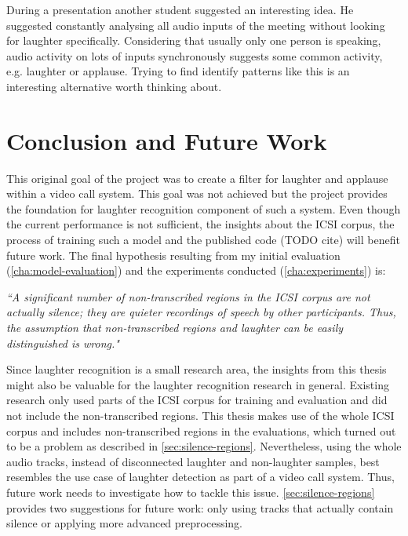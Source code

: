 \documentclass[bsc,frontabs,parskip,deptreport]{infthesis}
\begin{document}
During a presentation another student suggested an interesting idea. He suggested constantly analysing all audio inputs of the meeting without looking for laughter specifically. Considering that usually only one person is speaking, audio activity on lots of inputs synchronously suggests some common activity, e.g. laughter or applause. Trying to find identify patterns like this is an interesting alternative worth thinking about. 

\chapter{Conclusion and Future Work}
This original goal of the project was to create a filter for laughter and applause within a video call system. This goal was not achieved but the project provides the foundation for laughter recognition component of such a system.
Even though the current performance is not sufficient, the insights about the ICSI corpus, the process of training such a model and the published code (TODO cite) will benefit future work.
The final hypothesis resulting from my initial evaluation (\autoref{cha:model-evaluation}) and the experiments conducted (\autoref{cha:experiments}) is:

\textit{``A significant number of non-transcribed regions in the ICSI corpus are not actually silence; they are quieter recordings of speech by other participants. Thus, the assumption that non-transcribed regions and laughter can be easily distinguished is wrong."}

Since laughter recognition is a small research area, the insights from this thesis might also be valuable for the laughter recognition research in general. 
Existing research \citep{kennedy2004laughter,knox2006automatic, truong2005automatic} only used parts of the ICSI corpus for training and evaluation and did not include the non-transcribed regions. 
This thesis makes use of the whole ICSI corpus and includes non-transcribed regions in the evaluations, which turned out to be a problem as described in \autoref{sec:silence-regions}. Nevertheless, using the whole audio tracks, instead of disconnected laughter and non-laughter samples, best resembles the use case of laughter detection as part of a video call system. 
Thus, future work needs to investigate how to tackle this issue.
\autoref{sec:silence-regions} provides two suggestions for future work: only using tracks that actually contain silence or applying more advanced preprocessing. 
\end{document}
